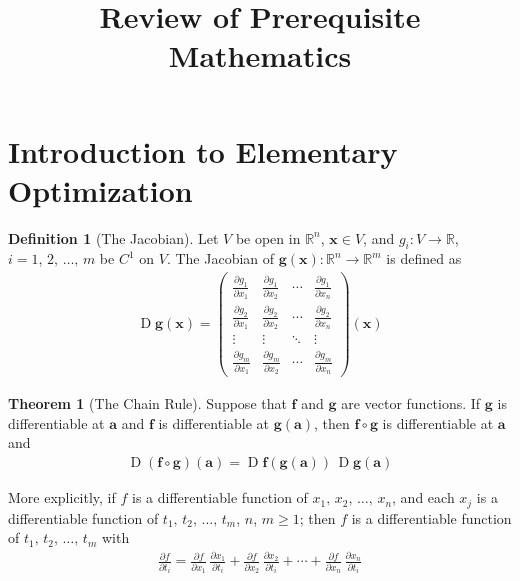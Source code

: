 \documentclass[10pt,handout]{beamer}
\title{Review of Prerequisite Mathematics}
\author{}
\date{}
\DeclareMathOperator*{\jac}{D}
\theoremstyle{definition}
\newtheorem*{dfn}{Definition}
\newtheorem*{thm}{Theorem}
\newcommand{\va}{\mathbf{a}}
\newcommand{\vx}{\mathbf{x}}
\newcommand{\vf}{\mathbf{f}}
\newcommand{\vg}{\mathbf{g}}
\newcommand{\pdiff}[2]{\frac{\partial #1}{\partial #2}}
\begin{document}
\begin{frame}
\titlepage
\end{frame}

\section{Introduction to Elementary Optimization}
\begin{frame}
  \begin{dfn}[The Jacobian]
    Let $V$ be open in $\mathbb{R}^n$, $\vx\in V$, and $g_i:V\to\mathbb{R}$, $i = 1,\,2,\,\ldots,\,m$ be $C^1$ on $V$. The Jacobian of $\vg(\vx): \mathbb{R}^n\to\mathbb{R}^m$ is defined as
    \vspace{-3mm}
    \begin{align*}
      \jac\vg(\vx) = %
      \begin{pmatrix}
        \frac{\partial g_1}{\partial x_1} & \frac{\partial g_1}{\partial x_2} & \cdots & \frac{\partial g_1}{\partial x_{\!n}} \\
        \frac{\partial g_2}{\partial x_1} & \frac{\partial g_2}{\partial x_2} & \cdots & \frac{\partial g_2}{\partial x_{\!n}} \\
        \vdots & \vdots & \ddots &\vdots \\
        \frac{\partial g_m}{\partial x_1} & \frac{\partial g_m}{\partial x_2} & \cdots & \frac{\partial g_m}{\partial x_{\!n}}
      \end{pmatrix}(\vx)
    \end{align*}
  \end{dfn}
  \begin{thm}[The Chain Rule]%
    Suppose that $\vf$ and $\vg$ are vector functions. If $\vg$ is differentiable at $\va$ and $\vf$ is differentiable at $\vg(\va)$, then $\vf\circ\vg$ is differentiable at $\va$ and
    \vspace{-2mm}
    \begin{align*}
      \jac(\vf\circ\vg)(\va) = \jac\vf(\vg(\va))\,\jac\vg(\va)
    \end{align*}

    \vspace{-2mm}
    More explicitly, if $f$ is a differentiable function of $x_1,\,x_2,\,\ldots,\,x_n$, and each $x_j$ is a differentiable function of $t_1,\,t_2,\,\ldots,\,t_m$, $n$, $m\geqslant 1$; then $f$ is a differentiable function of $t_1,\,t_2,\,\ldots,\,t_m$ with
    \vspace{-2mm}
    \begin{align*}
      \pdiff{f}{t_i} = \pdiff{f}{x_1}\,\pdiff{x_1}{t_i} + \pdiff{f}{x_2}\,\pdiff{x_2}{t_i} + \cdots + \pdiff{f}{x_n}\,\pdiff{x_n}{t_i}
    \end{align*}
  \end{thm}
\end{frame}
\end{document}
